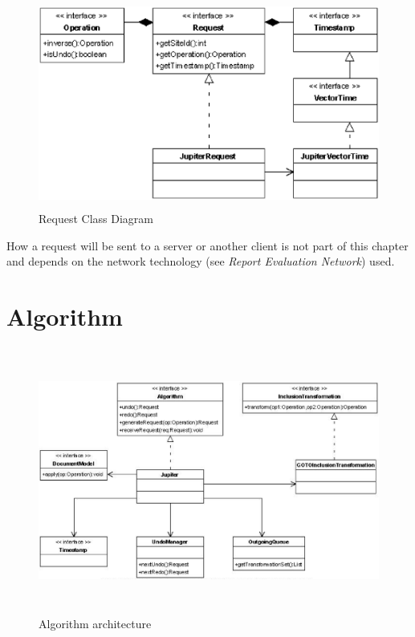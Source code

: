 \begin{figure}[H]
\centering
\includegraphics[height=6.87cm,width=12.09cm]{../../images/algo-impl/request_classdiagram.eps}
\caption{Request Class Diagram}
\label{Request Class Diagram}
\end{figure}

How a request will be sent to a server or another client is not part of this chapter and depends on the network technology (see \emph{Report Evaluation Network}) used.


\section{Algorithm}
\begin{figure}[H]
\centering
\includegraphics[height=8.74cm,width=14.95cm]{../../images/algo-impl/algorithm_diagram.eps}
\caption{Algorithm architecture}
\label{Algorithm architecture}
\end{figure}

